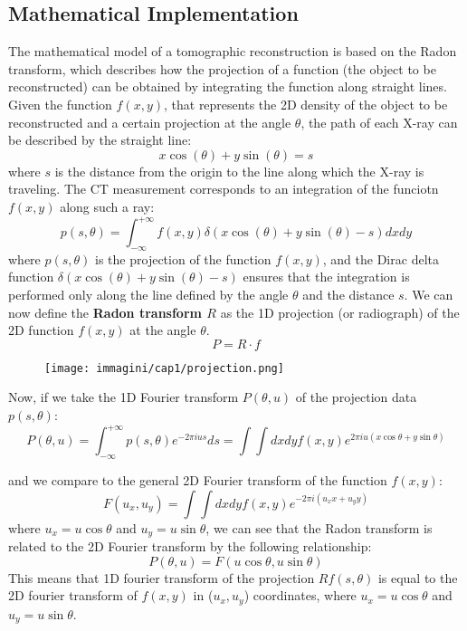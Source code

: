 \subsection{Mathematical Implementation}
The mathematical model of a tomographic reconstruction is based on the Radon transform, which describes how the projection of a function (the object to be reconstructed) can be obtained by integrating the function along straight lines.
Given the function \( f(x,y) \), that represents the 2D density of the object to be reconstructed and a certain projection at the angle \( \theta \), the path of each X-ray can be described by the straight line:
\begin{equation}
    x \cos(\theta) + y \sin(\theta) = s
\end{equation}
where \( s \) is the distance from the origin to the line along which the X-ray is traveling. The CT measurement corresponds to an integration of the funciotn \( f(x,y) \) along such a ray:
\begin{equation}
    p(s,\theta) = \int_{-\infty}^{+\infty} f(x,y) \delta(x \cos(\theta) + y \sin(\theta) - s) dx dy
\end{equation}
where \( p(s,\theta) \) is the projection of the function \( f(x,y) \), and the Dirac delta function \( \delta(x \cos(\theta) + y \sin(\theta) - s) \) ensures that the integration is performed only along the line defined by the angle \( \theta \) and the distance \( s \).
We can now define the \textbf{Radon transform \( R \)} as the 1D projection (or radiograph) of the 2D function \( f(x,y) \) at the angle \( \theta \).
\begin{equation}
    P = R\cdot f
\end{equation}
\begin{figure}[h!]
    \centering
    \texttt{[image: immagini/cap1/projection.png]} 
    \caption{} 
    \label{fig:radon}
\end{figure}

Now, if we take the 1D Fourier transform \( P(\theta, u) \) of the projection data \( p(s, \theta) \):
\begin{equation}
    P(\theta, u) = \int_{-\infty}^{+\infty} p(s, \theta) e^{-2\pi i u s} ds = \int \int dx dy f(x,y) e^{2\pi i u (x \cos\theta + y \sin\theta)}
\end{equation}

and we compare to the general 2D Fourier transform of the function \( f(x,y) \):
\begin{equation}
    F(u_x, u_y) = \int \int dx dy f(x,y) e^{-2\pi i (u_x x + u_y y)}
\end{equation}
where \( u_x = u \cos\theta \) and \( u_y = u \sin\theta \), we can see that the Radon transform is related to the 2D Fourier transform by the following relationship:
\begin{equation}
    P(\theta, u) = F(u \cos\theta, u \sin\theta)
\end{equation}
This means that 1D fourier transform of the projection $Rf(s, \theta)$ is equal to the 2D fourier transform of $f(x,y)$ in (\( u_x, u_y \)) coordinates, where \( u_x = u \cos\theta \) and \( u_y = u \sin\theta \).


